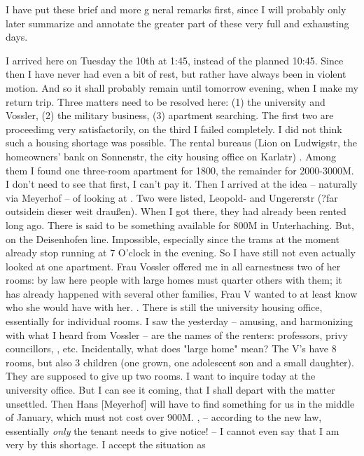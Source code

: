 I have put these brief and more g
neral remarks first, since I will probably only later summarize and annotate the greater part of{} these very full and exhausting days.

I arrived here on Tuesday the 10th at 1:45, instead of the planned 10:45. Since then I have never had even a bit of rest, but rather have always been in violent motion. And so it shall probably remain until tomorrow evening, when I make my return trip. Three matters need to be resolved here: (1) the university and Vossler, (2) the military business, (3) apartment searching. The first two are proceedimg very satisfactorily, on the third I failed completely. I did not think such a housing shortage was possible. The rental bureaus (Lion on Ludwigstr, the homeowners' bank on Sonnenstr, the city housing office on Karlatr) . Among them I found one three-room apartment for 1800, the remainder for 2000-3000M. I don't need to see that first, I can't pay it. Then I arrived at the idea -- naturally via Meyerhof -- of looking at . Two were listed, Leopold- and Ungererstr (?{far outside}{in dieser weit draußen}). When I got there, they had already been rented long ago. There is said to be something available for 800M in Unterhaching. But, on the Deisenhofen line.  Impossible, especially since the trams at the moment already stop running at 7 O'clock in the evening. So I have still not even actually looked at one apartment. Frau Vossler offered me in all earnestness two of her rooms: by law here people with large homes must quarter others with them; it has already happened with several other families, Frau V wanted to at least know who she would have with her. . There is still the university housing office, essentially for individual rooms. I saw the  yesterday -- amusing, and harmonizing with what I heard from Vossler -- are the names of the renters: professors, privy councillors, , etc. Incidentally, what does "large home" mean? The V's have 8 rooms, but also 3 children (one grown, one adolescent son and a small daughter). They are supposed to give up two rooms. I want to inquire today at the university office. But I can see it coming, that I shall depart with the matter unsettled. Then Hans [Meyerhof] will have to find something for us in the middle of January, which must not cost over 900M. , -- according to the new law, essentially \textit{only} the tenant needs to give notice! --  I cannot even say that I am very  by this shortage. I accept the situation as 